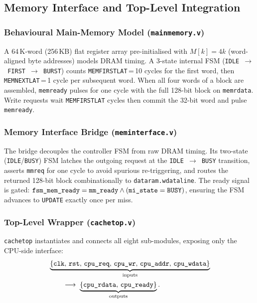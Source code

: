 \documentclass[conference]{IEEEtran}
\renewcommand{\_}{\textunderscore\allowbreak{}}
\begin{document}
\subsection{Memory Interface and Top-Level Integration}
\label{sec:sol-c}

\subsubsection{Behavioural Main-Memory Model (\texttt{main\_memory.v})}

A 64\,K-word (256\,KB) flat register array pre-initialised with
$M[k] = 4k$ (word-aligned byte addresses) models DRAM timing. A
3-state internal FSM (\texttt{IDLE\,$\to$\,FIRST\,$\to$\,BURST})
counts \texttt{MEM\_FIRST\_LAT}\,=\,10 cycles for the first word,
then \texttt{MEM\_NEXT\_LAT}\,=\,1 cycle per subsequent word. When
all four words of a block are assembled, \texttt{mem\_ready} pulses
for one cycle with the full 128-bit block on \texttt{mem\_rdata}.
Write requests wait \texttt{MEM\_FIRST\_LAT} cycles then commit the
32-bit word and pulse \texttt{mem\_ready}.

\subsubsection{Memory Interface Bridge (\texttt{mem\_interface.v})}

The bridge decouples the controller FSM from raw DRAM timing. Its
two-state (\texttt{IDLE}/\texttt{BUSY}) FSM latches the outgoing
request at the \texttt{IDLE\,$\to$\,BUSY} transition, asserts
\texttt{mm\_req} for one cycle to avoid spurious re-triggering, and
routes the returned 128-bit block combinationally to
\texttt{data\_ram.wdata\_line}. The ready signal is gated:
$\texttt{fsm\_mem\_ready} = \texttt{mm\_ready} \wedge
(\texttt{mi\_state} = \texttt{BUSY})$, ensuring the FSM advances
to \texttt{UPDATE} exactly once per miss.

\subsubsection{Top-Level Wrapper (\texttt{cache\_top.v})}

\texttt{cache\_top} instantiates and connects all eight sub-modules,
exposing only the CPU-side interface:
{\small
\begin{equation}
  \begin{split}
  &\underbrace{\{\texttt{clk},\,\texttt{rst},\,\texttt{cpu\_req},\,
  \texttt{cpu\_wr},\,\texttt{cpu\_addr},\,\texttt{cpu\_wdata}\}}_{\text{inputs}}\\
  &\qquad\longrightarrow\;
  \underbrace{\{\texttt{cpu\_rdata},\,\texttt{cpu\_ready}\}}_{\text{outputs}}.
  \end{split}
  \label{eq:iface}
\end{equation}
}
\end{document}
